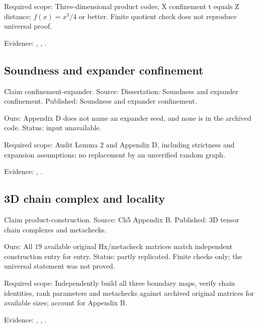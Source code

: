 Required scope: Three-dimensional product codes; X confinement t equals Z distance; $f(x)=x^3/4$ or better. Finite quotient check does not reproduce universal proof.

Evidence: \href{https://github.com/alectionary/vibe-math/blob/master/formalization/quintavalle-hgp/sources/browser-extraction.txt}{}, \href{https://github.com/alectionary/vibe-math/blob/master/formalization/quintavalle-hgp/availability.md}{}, \href{https://github.com/alectionary/vibe-math/blob/master/formalization/quintavalle-hgp/results/exact_checks.json}{}.
\subsection{Soundness and expander confinement}\label{claim:confinement-expander}
Claim confinement-expander. Source: Dissertation: Soundness and expander confinement. Published: Soundness and expander confinement.

Ours: Appendix D does not name an expander seed, and none is in the archived code. Status: input unavailable.

Required scope: Audit Lemma 2 and Appendix D, including strictness and expansion assumptions; no replacement by an unverified random graph.

Evidence: \href{https://github.com/alectionary/vibe-math/blob/master/formalization/quintavalle-hgp/sources/browser-extraction.txt}{}, \href{https://github.com/alectionary/vibe-math/blob/master/formalization/quintavalle-hgp/availability.md}{}.
\subsection{3D chain complex and locality}\label{claim:product-construction}
Claim product-construction. Source: Ch5 Appendix B. Published: 3D tensor chain complexes and metachecks.

Ours: All 19 available original Hx/metacheck matrices match independent construction entry for entry. Status: partly replicated. Finite checks only; the universal statement was not proved.

Required scope: Independently build all three boundary maps, verify chain identities, rank parameters and metachecks against archived original matrices for available sizes; account for Appendix B.

Evidence: \href{https://github.com/alectionary/vibe-math/blob/master/formalization/quintavalle-hgp/sources/browser-extraction.txt}{}, \href{https://github.com/alectionary/vibe-math/blob/master/formalization/quintavalle-hgp/availability.md}{}, \href{https://github.com/alectionary/vibe-math/blob/master/formalization/quintavalle-hgp/results/independent_checks.json}{}.
